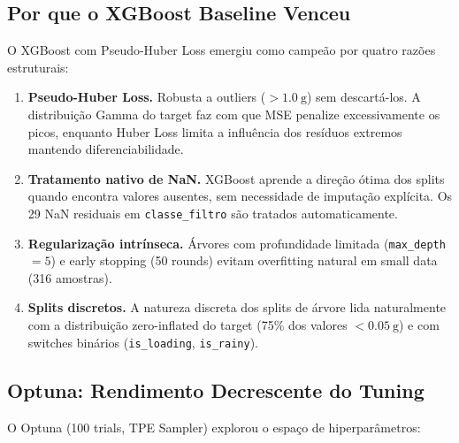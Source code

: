 \documentclass[12pt, a4paper]{article}
\newcommand{\feature}[1]{\texttt{#1}}
\begin{document}
\subsection{Por que o XGBoost Baseline Venceu}

O XGBoost com Pseudo-Huber Loss emergiu como campeão por quatro razões
estruturais:

\begin{enumerate}
    \item \textbf{Pseudo-Huber Loss.} Robusta a outliers
          ($> \SI{1,0}{\gram}$) sem descartá-los. A distribuição Gamma
          do target faz com que MSE penalize excessivamente os picos,
          enquanto Huber Loss limita a influência dos resíduos extremos
          mantendo diferenciabilidade.

    \item \textbf{Tratamento nativo de NaN.} XGBoost aprende a direção
          ótima dos splits quando encontra valores ausentes, sem
          necessidade de imputação explícita. Os 29 NaN residuais em
          \feature{classe\_filtro} são tratados automaticamente.

    \item \textbf{Regularização intrínseca.} Árvores com profundidade
          limitada (\texttt{max\_depth} $= 5$) e early stopping (50
          rounds) evitam overfitting natural em small data (316 amostras).

    \item \textbf{Splits discretos.} A natureza discreta dos splits de
          árvore lida naturalmente com a distribuição zero-inflated do
          target (75\% dos valores $< \SI{0,05}{\gram}$) e com switches
          binários (\feature{is\_loading}, \feature{is\_rainy}).
\end{enumerate}

\subsection{Optuna: Rendimento Decrescente do Tuning}

O Optuna (100 trials, TPE Sampler) explorou o espaço de hiperparâmetros:
\end{document}
